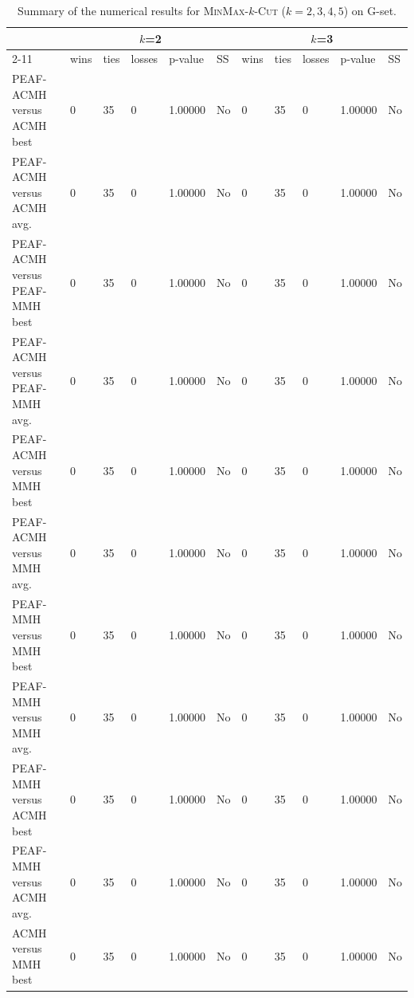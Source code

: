 \documentclass[12pt, a4paper]{article}%
\renewcommand{\arraystretch}{1.3}
\numberwithin{equation}{section}
\theoremstyle{plain}
\begin{document}
			
			
			{
				\scriptsize
				\setlength{\tabcolsep}{10pt}
				\renewcommand{\arraystretch}{1.6}
				\begin{landscape}
					\begin{longtable}{|l|lllll|lllll|}
						\caption[Summary for \textsc{MinMax}-$k$-\textsc{Cut}]{Summary of the numerical results for \textsc{MinMax}-$k$-\textsc{Cut} ($k=2,3,4,5$) on G-set. }
						\label{tab::min-max-summary}\\
						\hline
						\multicolumn{1}{|c|}{\multirow{2}{*}{}} & \multicolumn{5}{c|}{$k$=2}          & \multicolumn{5}{c|}{$k$=3}          \\ \cline{2-11} 
						\multicolumn{1}{|c|}{}                  & wins & ties & losses & p-value & SS & wins & ties & losses & p-value & SS \\ \hline
						PEAF-ACMH versus ACMH best             & 0    & 35   & 0      & 1.00000 & No & 0    & 35   & 0      & 1.00000 & No \\
						PEAF-ACMH versus ACMH avg.             & 0    & 35   & 0      & 1.00000 & No & 0    & 35   & 0      & 1.00000 & No \\
						PEAF-ACMH versus PEAF-MMH best           & 0    & 35   & 0      & 1.00000 & No & 0    & 35   & 0      & 1.00000 & No \\
						PEAF-ACMH versus PEAF-MMH avg.           & 0    & 35   & 0      & 1.00000 & No & 0    & 35   & 0      & 1.00000 & No \\
						PEAF-ACMH versus MMH best               & 0    & 35   & 0      & 1.00000 & No & 0    & 35   & 0      & 1.00000 & No \\
						PEAF-ACMH versus MMH avg.               & 0    & 35   & 0      & 1.00000 & No & 0    & 35   & 0      & 1.00000 & No \\
						PEAF-MMH versus MMH best                 & 0    & 35   & 0      & 1.00000 & No & 0    & 35   & 0      & 1.00000 & No \\
						PEAF-MMH versus MMH avg.                 & 0    & 35   & 0      & 1.00000 & No & 0    & 35   & 0      & 1.00000 & No \\
						PEAF-MMH versus ACMH best               & 0    & 35   & 0      & 1.00000 & No & 0    & 35   & 0      & 1.00000 & No \\
						PEAF-MMH versus ACMH avg.               & 0    & 35   & 0      & 1.00000 & No & 0    & 35   & 0      & 1.00000 & No \\
						ACMH versus MMH best                   & 0    & 35   & 0      & 1.00000 & No & 0    & 35   & 0      & 1.00000 & No \\

\end{longtable}
\end{landscape}}
\end{document}
